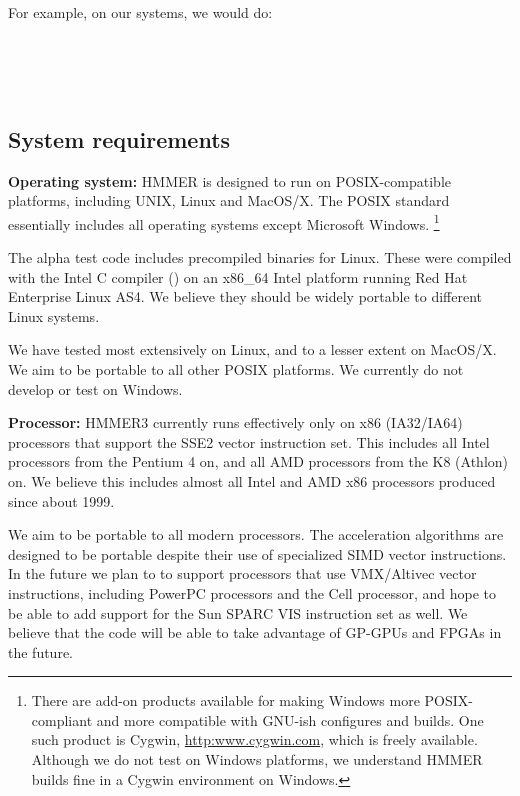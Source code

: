 For example, on our systems, we would do:

\\
\\
\\


\subsection{System requirements}

\textbf{Operating system:} HMMER is designed to run on
POSIX-compatible platforms, including UNIX, Linux and MacOS/X.  The
POSIX standard essentially includes all operating systems except
Microsoft Windows.
\footnote{There are add-on products available for making Windows more
  POSIX-compliant and more compatible with GNU-ish configures and
  builds. One such product is Cygwin, \url{http:www.cygwin.com}, which
  is freely available. Although we do not test on Windows platforms,
  we understand HMMER builds fine in a Cygwin environment on Windows.}

The alpha test code includes precompiled binaries for Linux. These
were compiled with the Intel C compiler () on an x86\_64
Intel platform running Red Hat Enterprise Linux AS4. We believe they
should be widely portable to different Linux systems. 

We have tested most extensively on Linux, and to a lesser extent on
MacOS/X. We aim to be portable to all other POSIX platforms. We
currently do not develop or test on Windows.


\textbf{Processor:} HMMER3 currently runs effectively only on x86
(IA32/IA64) processors that support the SSE2 vector instruction set.
This includes all Intel processors from the Pentium 4 on, and all AMD
processors from the K8 (Athlon) on. We believe this includes almost
all Intel and AMD x86 processors produced since about 1999.

We aim to be portable to all modern processors. The acceleration
algorithms are designed to be portable despite their use of
specialized SIMD vector instructions. In the future we plan to to
support processors that use VMX/Altivec vector instructions, including
PowerPC processors and the Cell processor, and hope to be able to add
support for the Sun SPARC VIS instruction set as well. We believe that
the code will be able to take advantage of GP-GPUs and FPGAs in the
future.

